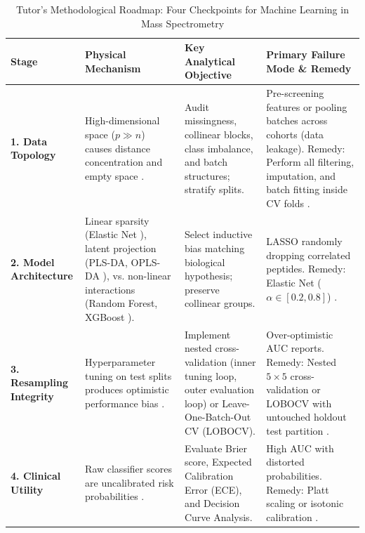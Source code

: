 \documentclass[11pt,oneside]{book}
\begin{document}
\begin{table}[ht]
\centering
\caption{Tutor's Methodological Roadmap: Four Checkpoints for Machine Learning in Mass Spectrometry}
\label{tab:ml_roadmap}
\small
\begin{tabularx}{\textwidth}{l p{3.8cm} p{4.2cm} X}
\toprule
\textbf{Stage} & \textbf{Physical Mechanism} & \textbf{Key Analytical Objective} & \textbf{Primary Failure Mode \& Remedy} \\
\midrule
\textbf{1. Data Topology} & High-dimensional space ($p \gg n$) causes distance concentration and empty space \cite{cover1965geometrical, hastie2009elements}. & Audit missingness, collinear blocks, class imbalance, and batch structures; stratify splits. & Pre-screening features or pooling batches across cohorts (data leakage). Remedy: Perform all filtering, imputation, and batch fitting inside CV folds \cite{ambroise2002selection, broadhurst2006statistical}. \\
\addlinespace
\textbf{2. Model Architecture} & Linear sparsity (Elastic Net \cite{zou2005regularization}), latent projection (PLS-DA, OPLS-DA \cite{barker2003partial, trygg2002orthogonal}), vs. non-linear interactions (Random Forest, XGBoost \cite{breiman2001random, chen2016xgboost}). & Select inductive bias matching biological hypothesis; preserve collinear groups. & LASSO randomly dropping correlated peptides. Remedy: Elastic Net ($\alpha \in [0.2, 0.8]$) \cite{zou2005regularization}. \\
\addlinespace
\textbf{3. Resampling Integrity} & Hyperparameter tuning on test splits produces optimistic performance bias \cite{kuhn2013applied}. & Implement nested cross-validation (inner tuning loop, outer evaluation loop) or Leave-One-Batch-Out CV (LOBOCV). & Over-optimistic AUC reports. Remedy: Nested $5 \times 5$ cross-validation or LOBOCV with untouched holdout test partition \cite{kuhn2022tidymodels}. \\
\addlinespace
\textbf{4. Clinical Utility} & Raw classifier scores are uncalibrated risk probabilities \cite{brier1950verification, platt1999probabilistic}. & Evaluate Brier score, Expected Calibration Error (ECE), and Decision Curve Analysis. & High AUC with distorted probabilities. Remedy: Platt scaling or isotonic calibration \cite{vickers2006decision}. \\
\bottomrule
\end{tabularx}
\end{table}
\end{document}
